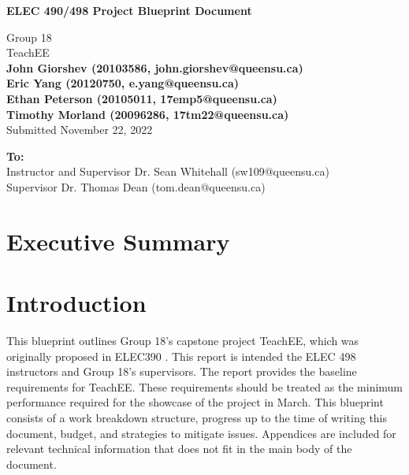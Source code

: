 \documentclass[letterpaper,12pt]{article}
\begin{document}
\begin{titlepage}
    \begin{center}
        \vspace*{1cm}

        \Large
        \textbf{ELEC 490/498 Project Blueprint Document}

        \vspace{0.5cm}
        Group 18\\
        TeachEE\\
        \vspace{0.5cm}
        \normalsize
        \textbf{John Giorshev (20103586, john.giorshev@queensu.ca) \\ Eric Yang (20120750, e.yang@queensu.ca) \\ Ethan Peterson (20105011, 17emp5@queensu.ca) \\ Timothy Morland (20096286, 17tm22@queensu.ca)}\\
        \vspace{0.5cm}
        Submitted November 22, 2022\\

        \vfill
            
        \textbf{To:}\\
        Instructor and Supervisor Dr. Sean Whitehall (sw109@queensu.ca) \\
        Supervisor Dr. Thomas Dean (tom.dean@queensu.ca) \\
            
        \vspace{1.8cm}

    \end{center}
\end{titlepage}
\section*{Executive Summary}
\newpage

\tableofcontents
\listoffigures
\listoftables
\newpage
{}
\section{Introduction} \label{sec:intro} %
This blueprint outlines Group 18's capstone project TeachEE, which was
originally proposed in ELEC390 \cite{prop_390}. This report is intended the ELEC 498 instructors
and Group 18's supervisors. The report provides the baseline requirements for
TeachEE. These requirements should be treated as the minimum performance
required for the showcase of the project in March. This blueprint consists of a
work breakdown structure, progress up to the time of writing this document,
budget, and strategies to mitigate issues. Appendices are
included for relevant technical information that does not fit in the main body
of the document.
\end{document}
